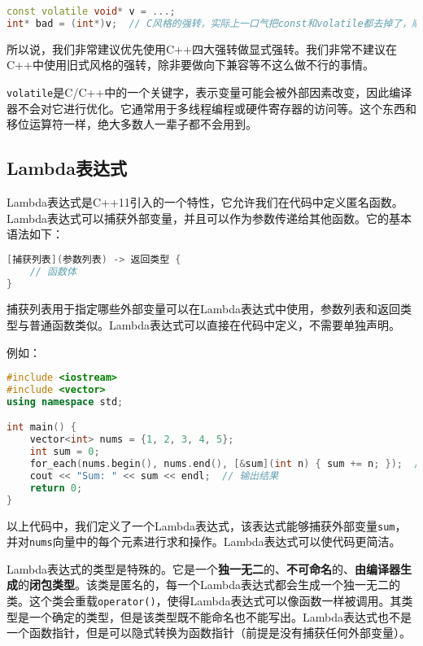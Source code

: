 \documentclass[../main.tex]{subfiles}
\begin{document}
\begin{lstlisting}[language=C++]
const volatile void* v = ...;
int* bad = (int*)v;  // C风格的强转，实际上一口气把const和volatile都去掉了，顺便做了个按位重解释
\end{lstlisting}

所以说，我们非常建议优先使用C++四大强转做显式强转。我们非常不建议在C++中使用旧式风格的强转，除非要做向下兼容等不这么做不行的事情。

\begin{note}
  \texttt{volatile}是C/C++中的一个关键字，表示变量可能会被外部因素改变，因此编译器不会对它进行优化。它通常用于多线程编程或硬件寄存器的访问等。这个东西和移位运算符一样，绝大多数人一辈子都不会用到。
\end{note}

\subsection{Lambda表达式}

Lambda表达式是C++11引入的一个特性，它允许我们在代码中定义匿名函数。Lambda表达式可以捕获外部变量，并且可以作为参数传递给其他函数。它的基本语法如下：
\begin{lstlisting}[language=C++]
[捕获列表](参数列表) -> 返回类型 {
    // 函数体
}
\end{lstlisting}
捕获列表用于指定哪些外部变量可以在Lambda表达式中使用，参数列表和返回类型与普通函数类似。Lambda表达式可以直接在代码中定义，不需要单独声明。

例如：
\begin{lstlisting}[language=C++]
#include <iostream>
#include <vector>
using namespace std;

int main() {
    vector<int> nums = {1, 2, 3, 4, 5};
    int sum = 0;
    for_each(nums.begin(), nums.end(), [&sum](int n) { sum += n; });  // 使用Lambda表达式计算总和
    cout << "Sum: " << sum << endl;  // 输出结果
    return 0;
}
\end{lstlisting}
以上代码中，我们定义了一个Lambda表达式，该表达式能够捕获外部变量\texttt{sum}，并对\texttt{nums}向量中的每个元素进行求和操作。Lambda表达式可以使代码更简洁。

Lambda表达式的类型是特殊的。它是一个\textbf{独一无二}的、\textbf{不可命名}的、\textbf{由编译器生成}的\textbf{闭包类型}。该类是匿名的，每一个Lambda表达式都会生成一个独一无二的类。这个类会重载\texttt{operator()}，使得Lambda表达式可以像函数一样被调用。其类型是一个确定的类型，但是该类型既不能命名也不能写出。Lambda表达式也不是一个函数指针，但是可以隐式转换为函数指针（前提是没有捕获任何外部变量）。
\end{document}
